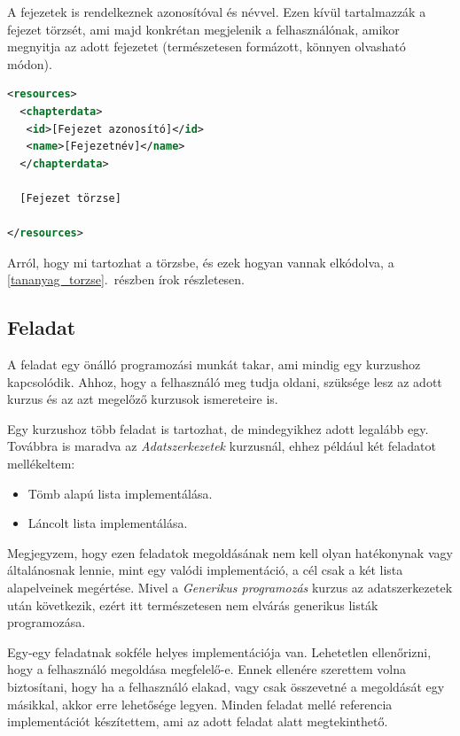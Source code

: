 \documentclass[12pt,a4paper]{article}
\begin{document}
	A fejezetek is rendelkeznek azonosítóval és névvel. Ezen kívül tartalmazzák a fejezet törzsét, ami majd konkrétan megjelenik a felhasználónak, amikor megnyitja az adott fejezetet (természetesen formázott, könnyen olvasható módon). 
	
	\bigskip
	\begin{lstlisting}[language=XML]
<resources>
  <chapterdata>
   <id>[Fejezet azonosító]</id>
   <name>[Fejezetnév]</name>
  </chapterdata>

  [Fejezet törzse]	
	
</resources>
	\end{lstlisting}
	
	Arról, hogy mi tartozhat a törzsbe, és ezek hogyan vannak elkódolva, a \ref{tananyag_torzse}.\ részben írok részletesen.
	
	\subsection{Feladat}\label{feladat}
	
	A feladat egy önálló programozási munkát takar, ami mindig egy kurzushoz kapcsolódik. Ahhoz, hogy a felhasználó meg tudja oldani, szüksége lesz az adott kurzus és az azt megelőző kurzusok ismereteire is.
	
	Egy kurzushoz több feladat is tartozhat, de mindegyikhez adott legalább egy. Továbbra is maradva az \textit{Adatszerkezetek} kurzusnál, ehhez például két feladatot mellékeltem:
	
	\begin{itemize}
		\item Tömb alapú lista implementálása.
		\item Láncolt lista implementálása.
	\end{itemize}

	Megjegyzem, hogy ezen feladatok megoldásának nem kell olyan hatékonynak vagy általánosnak lennie, mint egy valódi implementáció, a cél csak a két lista alapelveinek megértése. Mivel a \textit{Generikus programozás} kurzus az adatszerkezetek után következik, ezért itt természetesen nem elvárás generikus listák programozása.

	Egy-egy feladatnak sokféle helyes implementációja van. Lehetetlen ellenőrizni, hogy a felhasználó megoldása megfelelő-e. Ennek ellenére szerettem volna biztosítani, hogy ha a felhasználó elakad, vagy csak összevetné a megoldását egy másikkal, akkor erre lehetősége legyen. Minden feladat mellé referencia implementációt készítettem, ami az adott feladat alatt megtekinthető. 
\end{document}
